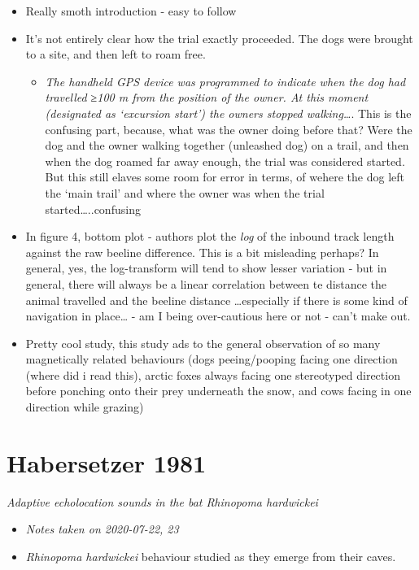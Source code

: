 \documentclass[
]{book}
\providecommand{\tightlist}{%
  \setlength{\itemsep}{0pt}\setlength{\parskip}{0pt}}
\begin{document}
\begin{itemize}
\tightlist
\item
  Really smoth introduction - easy to follow
\item
  It's not entirely clear how the trial exactly proceeded. The dogs were brought to a site, and then left to roam free.

  \begin{itemize}
  \tightlist
  \item
    \emph{The handheld GPS device was programmed to indicate when the dog had travelled ≥100 m from the position of the owner. At this moment (designated as `excursion start') the owners stopped walking\ldots{}}. This is the confusing part, because, what was the owner doing before that? Were the dog and the owner walking together (unleashed dog) on a trail, and then when the dog roamed far away enough, the trial was considered started. But this still elaves some room for error in terms, of wehere the dog left the `main trail' and where the owner was when the trial started\ldots..confusing
  \end{itemize}
\item
  In figure 4, bottom plot - authors plot the \emph{log} of the inbound track length against the raw beeline difference. This is a bit misleading perhaps? In general, yes, the log-transform will tend to show lesser variation - but in general, there will always be a linear correlation between te distance the animal travelled and the beeline distance \ldots especially if there is some kind of navigation in place\ldots{} - am I being over-cautious here or not - can't make out.
\item
  Pretty cool study, this study ads to the general observation of so many magnetically related behaviours (dogs peeing/pooping facing one direction (where did i read this), arctic foxes always facing one stereotyped direction before ponching onto their prey underneath the snow, and cows facing in one direction while grazing)
\end{itemize}

\hypertarget{habersetzermadurai}{%
\chapter{Habersetzer 1981}\label{habersetzermadurai}}

\emph{Adaptive echolocation sounds in the bat Rhinopoma hardwickei} \citep{habersetzer1981adaptive}

\begin{itemize}
\item
  \emph{Notes taken on 2020-07-22, 23}
\item
  \emph{Rhinopoma hardwickei} behaviour studied as they emerge from their caves.
\end{itemize}
\end{document}
